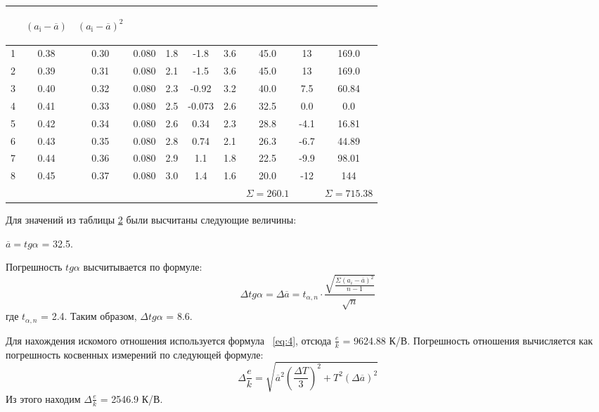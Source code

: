 \begin{center}
\begin{table}[H]
\begin{tabular}{|c|c|c|c|c|c|c|c|c|c|}
\begin{minipage}{25mm}
\end{minipage}&
\begin{minipage}{20mm}
     \begin{center} $(a_{\text{i}}-\overline{a})$ \end{center}
\end{minipage}&
\begin{minipage}{20mm}
     \begin{center} $(a_{\text{i}}-\overline{a})^2$ \end{center}
\end{minipage}\\
\hline
1 & 0.38 & 0.30 & 0.080 & 1.8 & -1.8   & 3.6 & 45.0 & 13   & 169.0 \\
2 & 0.39 & 0.31 & 0.080 & 2.1 & -1.5   & 3.6 & 45.0 & 13   & 169.0 \\
3 & 0.40 & 0.32 & 0.080 & 2.3 & -0.92  & 3.2 & 40.0 & 7.5  & 60.84 \\
4 & 0.41 & 0.33 & 0.080 & 2.5 & -0.073 & 2.6 & 32.5 & 0.0  & 0.0   \\
5 & 0.42 & 0.34 & 0.080 & 2.6 & 0.34   & 2.3 & 28.8 & -4.1 & 16.81 \\
6 & 0.43 & 0.35 & 0.080 & 2.8 & 0.74   & 2.1 & 26.3 & -6.7 & 44.89 \\
7 & 0.44 & 0.36 & 0.080 & 2.9 & 1.1    & 1.8 & 22.5 & -9.9 & 98.01 \\
8 & 0.45 & 0.37 & 0.080 & 3.0 & 1.4    & 1.6 & 20.0 & -12  & 144   \\
\hline
 & & & & & & & $\Sigma=260.1$ & & $\Sigma=715.38$\\
\hline
\end{tabular}
\end{table}
\end{center}

Для значений из таблицы \hyperref[tabl:3]{2} были высчитаны следующие величины: 

$\overline{a}=tg{\alpha}$ = 32.5.

Погрешность  $tg{\alpha}$ высчитывается по формуле:
\begin{equation}
\label{eq:5}
    \Delta tg{\alpha}=\Delta\overline{a}=t_{\alpha,n}\cdot\frac{\sqrt{\frac{\Sigma(a_i-\overline{a})^2}{{n-1}}}}{\sqrt{n}}
\end{equation}
где $t_{\alpha,n}$ = 2.4. Таким образом, $\Delta tg{\alpha}$ = 8.6.

Для нахождения искомого отношения используется формула ~\ref{eq:4}, отсюда $\frac{e}{k}$ = 9624.88 К/В. Погрешность отношения вычисляется как погрешность косвенных измерений по следующей формуле:
\begin{equation}
\label{eq:6}
    \Delta\frac{e}{k}=\sqrt{\overline{a}^2(\frac{\Delta T}{3})^2+T^2(\Delta\overline{a})^2}
\end{equation}
Из этого находим $\Delta\frac{e}{k}$ = 2546.9 К/В.

